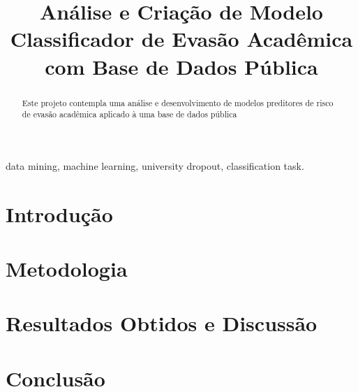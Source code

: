 \documentclass[conference]{IEEEtran}
\begin{document}
\title{Análise e Criação de Modelo Classificador de Evasão Acadêmica com Base de Dados Pública\\
}

\author{
}

\maketitle

\begin{abstract}
Este projeto contempla uma análise e desenvolvimento de modelos preditores de risco de evasão acadêmica aplicado à uma base de dados pública
\end{abstract}

\begin{IEEEkeywords}
data mining, machine learning, university dropout, classification task.
\end{IEEEkeywords}

\section{Introdução}


\section{Metodologia}


\section{Resultados Obtidos e Discussão}


\section{Conclusão}



\end{document}
